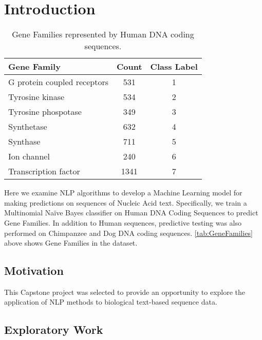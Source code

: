 \section{Introduction}

\begin{table}[tb]
  \centering
  \begin{tabular}{lSS}
    \toprule
    \textbf{Gene Family}      & \textbf{Count} & \textbf{Class Label}\\
    \midrule
    G protein coupled receptors	 & 531 & 1\\
    Tyrosine kinase	 & 534	 & 2\\
    Tyrosine phospotase	 & 349	 & 3\\
    Synthetase	 & 632	 & 4\\
    Synthase	 & 711	 & 5\\
    Ion channel	 & 240	 & 6\\
    Transcription factor	 & 1341	 & 7\\
    \bottomrule
  \end{tabular}
  \caption{
    Gene Families represented by Human DNA coding sequences.
  }
  \label{tab:GeneFamilies}
\end{table}

Here we examine NLP algorithms to develop a Machine Learning model for making predictions on sequences of Nucleic Acid text. Specifically, we train a Multinomial Na\"ive Bayes classifier on Human DNA Coding Sequences to predict Gene Families. In addition to Human sequences, predictive testing was also performed on Chimpanzee and Dog DNA coding sequences.
%
\autoref{tab:GeneFamilies} above shows Gene Families in the dataset.

\subsection{Motivation}

This Capstone project was selected to provide an opportunity to explore the application of NLP methods to biological text-based sequence data.


\subsection{Exploratory Work}

